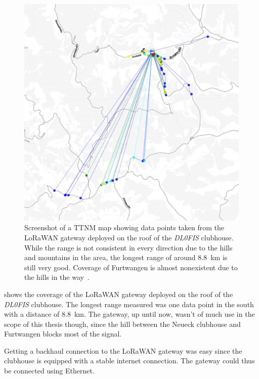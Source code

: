 \begin{figure}[htbp]
    \centering
    \includegraphics[width=1\textwidth]{pictures/ttn-mapper/gateway-ranges/dl0fis_gw_range.jpg}
    \caption{
        Screenshot of a \ac{TTNM} map showing data points taken from the \ac{LoRaWAN} gateway deployed on the roof of the \emph{DL0FIS} clubhouse.
        While the range is not consistent in every direction due to the hills and mountains in the area, the longest range of around \SI{8.8}{\kilo\meter} is still very good.
        Coverage of Furtwangen is almost nonexistent due to the hills in the way~\cite{ttn_mapper_ttn_2023}.
    }\label{pic:dl0fis_gw_range}
\end{figure}

 shows the coverage of the \ac{LoRaWAN} gateway deployed on the roof of the \emph{DL0FIS} clubhouse.
The longest range measured was one data point in the south with a distance of \SI{8.8}{\kilo\meter}.
The gateway, up until now, wasn't of much use in the scope of this thesis though, since the hill between the Neueck clubhouse and Furtwangen blocks most of the signal.


Getting a backhaul connection to the \ac{LoRaWAN} gateway was easy since the clubhouse is equipped with a stable internet connection.
The gateway could thus be connected using Ethernet.


